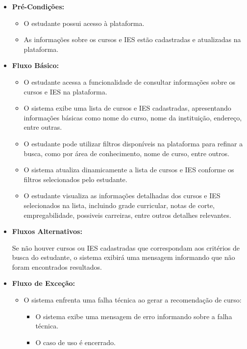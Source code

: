 \begin{itemize}
\begin{itemize}
        \item \textbf{Pré-Condições:}  
        \begin{itemize}
            \item O estudante possui acesso à plataforma.
            \item As informações sobre os cursos e IES estão cadastradas e atualizadas na plataforma.
        \end{itemize}
        \item \textbf{Fluxo Básico:}
        \begin{itemize}
            \item O estudante acessa a funcionalidade de consultar informações sobre os cursos e IES na plataforma.
            \item O sistema exibe uma lista de cursos e IES cadastradas, apresentando informações básicas como nome do curso, nome da instituição, endereço, entre outras.
            \item O estudante pode utilizar filtros disponíveis na plataforma para refinar a busca, como por área de conhecimento, nome de curso, entre outros.
            \item O sistema atualiza dinamicamente a lista de cursos e IES conforme os filtros selecionados pelo estudante.
            \item O estudante visualiza as informações detalhadas dos cursos e IES selecionados na lista, incluindo grade curricular, notas de corte, empregabilidade, possiveis carreiras, entre outros detalhes relevantes.
        \end{itemize}
        \item  \textbf{Fluxos Alternativos:}

        Se não houver cursos ou IES cadastradas que correspondam aos critérios de busca do estudante, o sistema exibirá uma mensagem informando que não foram encontrados resultados.
        \item \textbf{Fluxo de Exceção:}
        \begin{itemize}
            \item O sistema enfrenta uma falha técnica ao gerar a recomendação de curso:
            \begin{itemize}
                \item O sistema exibe uma mensagem de erro informando sobre a falha técnica.
                \item O caso de uso é encerrado.
            \end{itemize}
        \end{itemize}
    \end{itemize}
\end{itemize}

